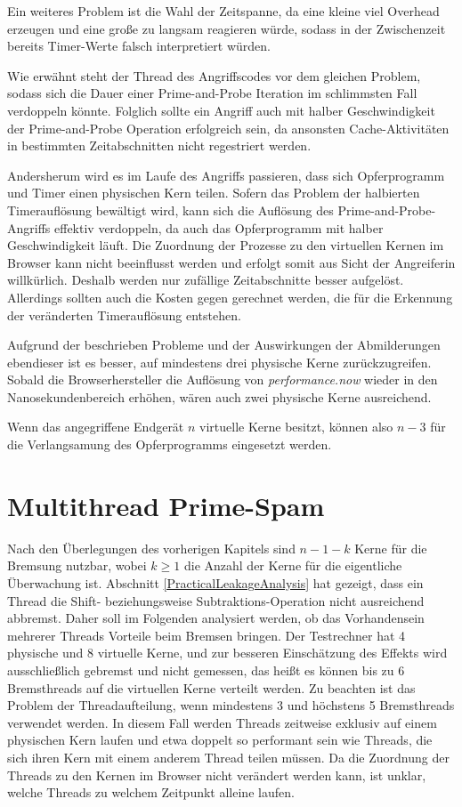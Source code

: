 Ein weiteres Problem ist die Wahl der Zeitspanne, da eine kleine viel Overhead erzeugen und eine große zu langsam reagieren würde, sodass in der Zwischenzeit bereits Timer-Werte falsch interpretiert würden.

Wie erwähnt steht der Thread des Angriffscodes vor dem gleichen Problem, sodass sich die Dauer einer Prime-and-Probe Iteration im schlimmsten Fall verdoppeln könnte.
Folglich sollte ein Angriff auch mit halber Geschwindigkeit der Prime-and-Probe Operation erfolgreich sein, da ansonsten Cache-Aktivitäten in bestimmten Zeitabschnitten nicht regestriert werden.

Andersherum wird es im Laufe des Angriffs passieren, dass sich Opferprogramm und Timer einen physischen Kern teilen.
Sofern das Problem der halbierten Timerauflösung bewältigt wird, kann sich die Auflösung des Prime-and-Probe-Angriffs effektiv verdoppeln, da auch das Opferprogramm mit halber Geschwindigkeit läuft.
Die Zuordnung der Prozesse zu den virtuellen Kernen im Browser kann nicht beeinflusst werden und erfolgt somit aus Sicht der Angreiferin willkürlich. 
Deshalb werden nur zufällige Zeitabschnitte besser aufgelöst.
Allerdings sollten auch die Kosten gegen gerechnet werden, die für die Erkennung der veränderten Timerauflösung entstehen.

Aufgrund der beschrieben Probleme und der Auswirkungen der Abmilderungen ebendieser ist es besser, auf mindestens drei physische Kerne zurückzugreifen.
Sobald die Browserhersteller die Auflösung von \textit{performance.now} wieder in den Nanosekundenbereich erhöhen, wären auch zwei physische Kerne ausreichend. 

Wenn das angegriffene Endgerät $n$ virtuelle Kerne besitzt, können also $n-3$ für die Verlangsamung des Opferprogramms eingesetzt werden.

\section{Multithread Prime-Spam}
\label{MoreIsBetter}

Nach den Überlegungen des vorherigen Kapitels sind $n-1-k$ Kerne für die Bremsung nutzbar, wobei $k \geq 1$ die Anzahl der Kerne für die eigentliche Überwachung ist. 
Abschnitt \ref{PracticalLeakageAnalysis} hat gezeigt, dass ein Thread die Shift- beziehungsweise Subtraktions-Operation nicht ausreichend abbremst.
Daher soll im Folgenden analysiert werden, ob das Vorhandensein mehrerer Threads Vorteile beim Bremsen bringen.
Der Testrechner hat 4 physische und 8 virtuelle Kerne, und zur besseren Einschätzung des Effekts wird ausschließlich gebremst und nicht gemessen, das heißt es können bis zu 6 Bremsthreads auf die virtuellen Kerne verteilt werden.
Zu beachten ist das Problem der Threadaufteilung, wenn mindestens 3 und höchstens 5 Bremsthreads verwendet werden.
In diesem Fall werden Threads zeitweise exklusiv auf einem physischen Kern laufen und etwa doppelt so performant sein wie Threads, die sich ihren Kern mit einem anderem Thread teilen müssen.
Da die Zuordnung der Threads zu den Kernen im Browser nicht verändert werden kann, ist unklar, welche Threads zu welchem Zeitpunkt alleine laufen.

